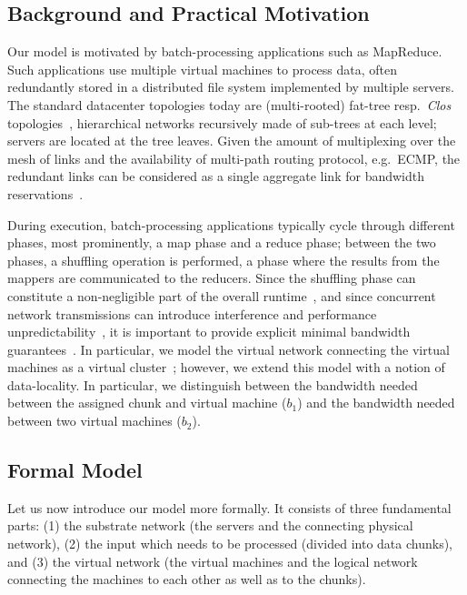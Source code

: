 \documentclass[preprint,12pt]{elsarticle}
\newcommand{\CostTrans}{\ensuremath{b_1}}
\newcommand{\CostCom}{\ensuremath{b_2}}
\begin{document}
\subsection{Background and Practical Motivation}

Our model is motivated by batch-processing applications such as MapReduce.
Such applications use multiple virtual machines to
process data, often redundantly stored in a distributed file system implemented
by multiple servers.~\cite{local-schedule-1,mapreduce}
The standard datacenter topologies today are (multi-rooted) fat-tree resp.~\emph{Clos} topologies~\cite{fattree,vl2},
hierarchical networks  recursively made of sub-trees at each level;
servers are located at the
tree leaves. Given the amount of multiplexing over the mesh of links
and the availability of multi-path routing protocol, e.g.~ECMP, the redundant
links can be considered as a single aggregate link for bandwidth
reservations~\cite{oktopus,proteus}.

During execution, batch-processing applications typically cycle through different phases,
most prominently, a map phase and a reduce phase; between the two phases,
a shuffling operation is performed, a phase where the results from the mappers
are communicated to the reducers. Since the shuffling phase can constitute a
non-negligible part of the overall runtime~\cite{orchestra},
and since concurrent network transmissions can introduce interference and
performance unpredictability~\cite{amazonbw}, it is important
to provide explicit minimal bandwidth guarantees~\cite{talk-about}.
In particular, we model the virtual network connecting the virtual machines
as a virtual cluster~\cite{oktopus,talk-about,proteus};
however, we extend this model with a notion of data-locality.
In particular, we distinguish between the bandwidth needed between the assigned chunk
and virtual machine ($\CostTrans$) and the bandwidth needed between
two virtual machines ($\CostCom$). 

\subsection{Formal Model}

Let us now introduce our model more formally. It consists of three fundamental parts: (1) the substrate network (the servers
and the connecting physical network),
(2) the input which needs to be processed (divided into data chunks), and
(3) the virtual network (the virtual machines and the logical network connecting the machines to each other
as well as to the chunks).
\end{document}
